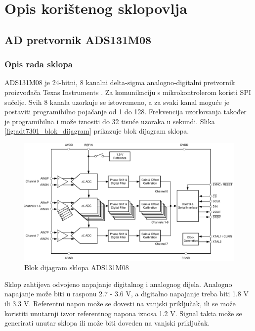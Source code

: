 \chapter{Opis korištenog sklopovlja}
    \section{AD pretvornik ADS131M08}

        \subsection{Opis rada sklopa}
            ADS131M08 je 24-bitni, 8 kanalni delta-sigma analogno-digitalni pretvornik  proizvođača Texas Instruments \cite{ads131m08_datasheet}. Za komunikaciju s mikrokontrolerom koristi SPI sučelje. Svih 8 kanala uzorkuje se istovremeno, a za svaki kanal moguće je postaviti programibilno pojačanje od 1 do 128. Frekvencija uzorkovanja također je programibilna i može iznositi do 32 tisuće uzoraka u sekundi. Slika \ref{fig:adt7301_blok_dijagram} prikazuje blok dijagram sklopa.

            \begin{figure}[htb]
                \centering
                \includegraphics[width=\textwidth]{slike/ads131m08_blok_dijagram.png}
                \caption{Blok dijagram sklopa ADS131M08 \cite{ads131m08_datasheet}}
                \label{fig:ads131m08_blok_dijagram}
            \end{figure}

            Sklop zahtijeva odvojeno napajanje digitalnog i analognog dijela. Analogno napajanje može biti u rasponu 2.7 - 3.6 V, a digitalno napajanje treba biti 1.8 V ili 3.3 V. Referentni napon može se dovesti na vanjski priključak, ili se može koristiti unutarnji izvor referentnog napona iznosa 1.2 V. Signal takta može se generirati unutar sklopa ili može biti doveden na vanjski priključak. 

